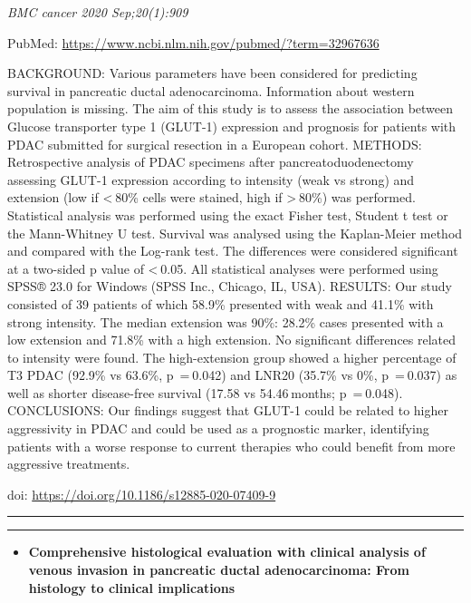 \documentclass[
]{article}
\providecommand{\tightlist}{%
  \setlength{\itemsep}{0pt}\setlength{\parskip}{0pt}}
\begin{document}
\emph{BMC cancer 2020 Sep;20(1):909}

PubMed: \url{https://www.ncbi.nlm.nih.gov/pubmed/?term=32967636}

BACKGROUND: Various parameters have been considered for predicting
survival in pancreatic ductal adenocarcinoma. Information about western
population is missing. The aim of this study is to assess the
association between Glucose transporter type 1 (GLUT-1) expression and
prognosis for patients with PDAC submitted for surgical resection in a
European cohort. METHODS: Retrospective analysis of PDAC specimens after
pancreatoduodenectomy assessing GLUT-1 expression according to intensity
(weak vs strong) and extension (low if \textless{} 80\% cells were
stained, high if \textgreater{} 80\%) was performed. Statistical
analysis was performed using the exact Fisher test, Student t test or
the Mann-Whitney U test. Survival was analysed using the Kaplan-Meier
method and compared with the Log-rank test. The differences were
considered significant at a two-sided p value of \textless{} 0.05. All
statistical analyses were performed using SPSS® 23.0 for Windows (SPSS
Inc., Chicago, IL, USA). RESULTS: Our study consisted of 39 patients of
which 58.9\% presented with weak and 41.1\% with strong intensity. The
median extension was 90\%: 28.2\% cases presented with a low extension
and 71.8\% with a high extension. No significant differences related to
intensity were found. The high-extension group showed a higher
percentage of T3 PDAC (92.9\% vs 63.6\%, p~= 0.042) and LNR20 (35.7\% vs
0\%, p~= 0.037) as well as shorter disease-free survival (17.58 vs
54.46 months; p~= 0.048). CONCLUSIONS: Our findings suggest that GLUT-1
could be related to higher aggressivity in PDAC and could be used as a
prognostic marker, identifying patients with a worse response to current
therapies who could benefit from more aggressive treatments.

doi: \url{https://doi.org/10.1186/s12885-020-07409-9}

\begin{center}\rule{0.5\linewidth}{0.5pt}\end{center}

\begin{center}\rule{0.5\linewidth}{0.5pt}\end{center}

\begin{itemize}
\tightlist
\item
  \textbf{Comprehensive histological evaluation with clinical analysis
  of venous invasion in pancreatic ductal adenocarcinoma: From histology
  to clinical implications}
\end{itemize}
\end{document}
